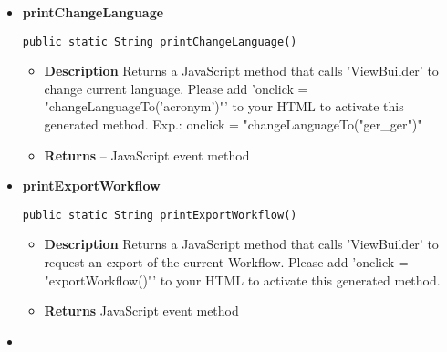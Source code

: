 \documentclass[11pt,a4paper]{report}
\begin{document}
{{{{{{{{{{{{{{{\begin{itemize}
{\begin{itemize}
							\item{
								{\bf  Description}
								Returns a JavaScript method that calls 'ViewBuilder' to change the current Workflow. Please add 'onclick = "changeWorkflowTo('workflowID')"' to your HTML to activate this generated method.
							}
							\item{
								{\bf  Returns} -- JavaScript event method 
							}%
						\end{itemize}
					}%
					\item{ 
						\hypertarget{studyplanning.view.JavaScriptBuilder.printChangeLanguage()}{{\bf  printChangeLanguage}\\}
						\begin{lstlisting}[frame=none]
public static String printChangeLanguage()
						\end{lstlisting} %
						\begin{itemize}
							\item{
								{\bf  Description}
								Returns a JavaScript method that calls 'ViewBuilder' to change current language. Please add 'onclick = "changeLanguageTo('acronym')"' to your HTML to activate this generated method. Exp.: onclick = "changeLanguageTo("ger\_ger")"
							}
							\item{
								{\bf  Returns} -- JavaScript event method 
							}%
						\end{itemize}
					}%
					\item{ 
						\hypertarget{studyplanning.view.JavaScriptBuilder.printExportWorkflow()}{{\bf  printExportWorkflow}\\}
						\begin{lstlisting}[frame=none]
public static String printExportWorkflow()
						\end{lstlisting} %
						\begin{itemize}
							\item{
								{\bf  Description}
								Returns a JavaScript method that calls 'ViewBuilder' to request an export of the current Workflow. Please add 'onclick = "exportWorkflow()"' to your HTML to activate this generated method.
							}
							\item{
								{\bf  Returns} JavaScript event method 
							}%
						\end{itemize}
					}%
					\item{ 
}
\end{itemize}}}}}}}}}}}}}}}}
\end{document}
